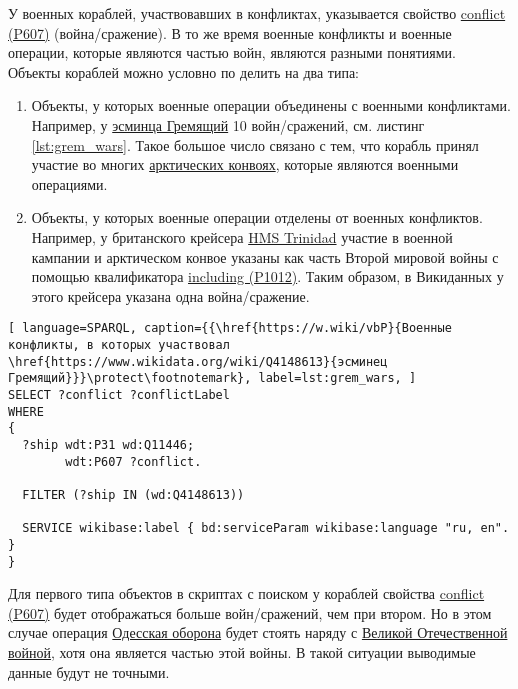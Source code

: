 У военных кораблей, участвовавших в конфликтах, указывается свойство \href{https://www.wikidata.org/wiki/Property:P607}{conflict (P607)} (война/сражение). В то же время военные конфликты и военные операции, которые являются частью войн, являются разными понятиями. Объекты кораблей можно условно по делить на два типа:

\begin{enumerate}
  \item Объекты, у которых военные операции объединены с военными конфликтами. Например, у \href{https://www.wikidata.org/wiki/Q4148613}{эсминца Гремящий} 10 войн/сражений, см. листинг \ref{lst:grem_wars}. Такое большое число связано с тем, что корабль принял участие во многих \href{https://ru.wikipedia.org/wiki/Арктические_конвои}{арктических конвоях}, которые являются военными операциями.
  \item Объекты, у которых военные операции отделены от военных конфликтов. Например, у британского крейсера \href{https://ru.wikipedia.org/wiki/HMS_Trinidad_(1940)}{HMS Trinidad} участие в военной кампании и арктическом конвое указаны как часть Второй мировой войны с помощью квалификатора \href{https://www.wikidata.org/wiki/Property:P1012}{including (P1012)}. Таким образом, в Викиданных у этого крейсера указана одна война/сражение.
\end{enumerate}


\label{question:ship_3}


\begin{lstlisting}[ language=SPARQL, caption={{\href{https://w.wiki/vbP}{Военные конфликты, в которых участвовал \href{https://www.wikidata.org/wiki/Q4148613}{эсминец Гремящий}}}\protect\footnotemark}, label=lst:grem_wars, ]
SELECT ?conflict ?conflictLabel
WHERE
{
  ?ship wdt:P31 wd:Q11446;
        wdt:P607 ?conflict.
    
  FILTER (?ship IN (wd:Q4148613))
              
  SERVICE wikibase:label { bd:serviceParam wikibase:language "ru, en". }
}
\end{lstlisting}

Для первого типа объектов в скриптах с поиском у кораблей свойства \href{https://www.wikidata.org/wiki/Property:P607}{conflict (P607)} будет отображаться больше войн/сражений, чем при втором. Но в этом случае операция \href{https://ru.wikipedia.org/wiki/Одесская_оборона_(1941)}{Одесская оборона} будет стоять наряду с \href{https://ru.wikipedia.org/wiki/Великая_Отечественная_война}{Великой Отечественной войной}, хотя она является частью этой войны. В такой ситуации выводимые данные будут не точными.

